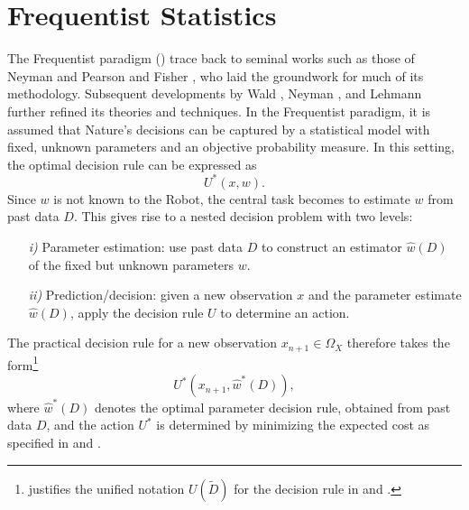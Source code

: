 \section{Frequentist Statistics}
\label{chp:freq}
The Frequentist paradigm () trace back to seminal works such as those of Neyman and Pearson \citep{Neyman1928OnSR} and Fisher \citep{fisher1925statistical}, who laid the groundwork for much of its methodology. Subsequent developments by Wald \citep{Wald1945Sequential}, Neyman \citep{Neyman1948Consistent}, and Lehmann \citep{lehmann1986testing} further refined its theories and techniques.\newline
In the Frequentist paradigm, it is assumed that Nature's decisions can be captured by a statistical model with fixed, unknown parameters and an objective probability measure. In this setting, the optimal decision rule can be expressed as
\begin{equation}
	U^*(x,w).
\end{equation}
Since $w$ is not known to the Robot, the central task becomes to estimate $w$ from past data $D$. This gives rise to a nested decision problem with two levels:
\begin{enumerate}
	\item[\textit{i)}] Parameter estimation: use past data $D$ to construct an estimator $\hat{w}(D)$ of the fixed but unknown parameters $w$.
	\item[\textit{ii)}] Prediction/decision: given a new observation $x$ and the parameter estimate $\hat{w}(D)$, apply the decision rule $U$ to determine an action.
\end{enumerate}
The practical decision rule for a new observation $x_{n+1} \in \Omega_X$ therefore takes the form\footnote{ justifies the unified notation $U(\tilde{D})$ for the decision rule in  and .}
\begin{equation}
	U^*(x_{n+1}, \hat{w}^*(D)),
	\label{eq:decision_rule_frequentist}
\end{equation}
where $\hat{w}^*(D)$ denotes the optimal parameter decision rule, obtained from past data $D$, and the action $U^*$ is determined by minimizing the expected cost as specified in  and .


